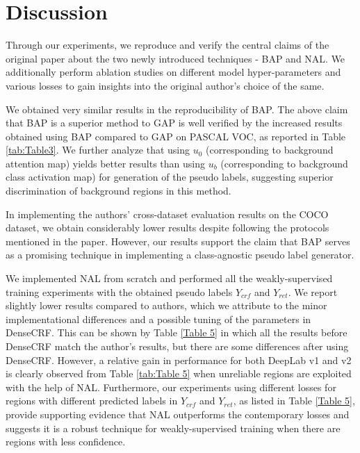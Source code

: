
\vspace{5mm}
\section{Discussion}
Through our experiments, we reproduce and verify the central claims of the original paper about the two newly introduced techniques - BAP and NAL. We additionally perform ablation studies on different model hyper-parameters and various losses to gain insights into the original author's choice of the same.

We obtained very similar results in the reproducibility of BAP. The above claim that BAP is a superior method to GAP is well verified by the increased results obtained using BAP compared to GAP on PASCAL VOC, as reported in Table \ref{tab:Table3}. We further analyze that using $u_0$ (corresponding to background attention map) yields better results than using $u_b$ (corresponding to background class activation map) for generation of the pseudo labels, suggesting superior discrimination of background regions in this method.

In implementing the authors' cross-dataset evaluation results on the COCO dataset, we obtain considerably lower results despite following the protocols mentioned in the paper. However, our results support the claim that BAP serves as a promising technique in implementing a class-agnostic pseudo label generator.

We implemented NAL from scratch and performed all the weakly-supervised training experiments with the obtained pseudo labels $Y_{crf}$ and $Y_{ret}$.
We report slightly lower results compared to authors, which we attribute to the minor implementational differences and a possible tuning of the parameters in DenseCRF. This can be shown by Table \ref{Table 5} in which all the results before DenseCRF match the author's results, but there are some differences after using DenseCRF. However, a relative gain in performance for both DeepLab v1 and v2 is clearly observed from Table \ref{tab:Table 5} when unreliable regions are exploited with the help of NAL. Furthermore, our experiments using different losses for regions with different predicted labels in $Y_{crf}$ and $Y_{ret}$, as listed in Table \ref{Table 5}, provide supporting evidence that NAL outperforms the contemporary losses and suggests it is a robust technique for weakly-supervised training when there are regions with less confidence.

